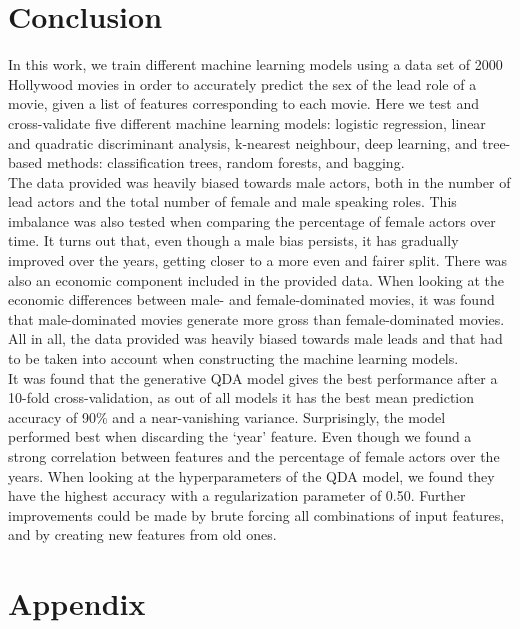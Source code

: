\documentclass{article}
\begin{document}
\section{Conclusion}
In this work, we train different machine learning models using a data set of 2000 Hollywood movies in order to accurately predict the sex of the lead role of a movie, given a list of features corresponding to each movie. Here we test and cross-validate five different machine learning models: logistic regression, linear  and quadratic discriminant analysis, k-nearest neighbour, deep learning, and tree-based methods: classification trees, random forests, and bagging. \\


The data provided was heavily biased towards male actors, both in the number of lead actors and the total number of female and male speaking roles. This imbalance was also tested when comparing the percentage of female actors over time. It turns out that, even though a male bias persists, it has gradually improved over the years, getting closer to a more even and fairer split. There was also an economic component included in the provided data. When looking at the economic differences between male- and female-dominated movies, it was found that male-dominated movies generate more gross than female-dominated movies. All in all, the data provided was heavily biased towards male leads and that had to be taken into account when constructing the machine learning models.\\


It was found that the generative QDA model gives the best performance after a 10-fold cross-validation, as out of all models it has the best mean prediction accuracy of 90\% and a near-vanishing variance. Surprisingly, the model performed best when discarding the `year' feature. Even though we found a strong correlation between features and the percentage of female actors over the years. When looking at the hyperparameters of the QDA model, we found they have the highest accuracy with a regularization parameter of 0.50. Further improvements could be made by brute forcing all combinations of input features, and by creating new features from old ones.

\newpage
\appendix
\setcounter{figure}{0}
\renewcommand\thefigure{\thesection.\arabic{figure}}
\section{Appendix}
\end{document}
